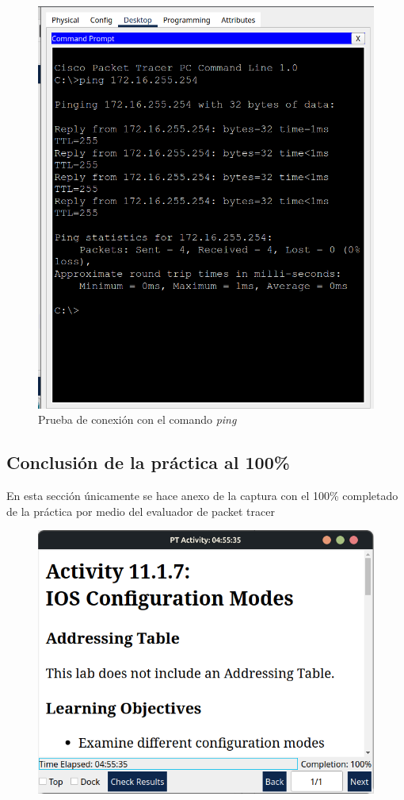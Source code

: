 \documentclass[a4paper,11pt]{article}
\begin{document}
\begin{figure}[H]
    \includegraphics[width=1\textwidth]{images/routers/ping.png}
    \caption{Prueba de conexión con el comando \emph{ping}}
\end{figure}

\subsection{Conclusión de la práctica al 100\%}
En esta sección únicamente se hace anexo de la captura con el 100\% completado
de la práctica por medio del evaluador de packet tracer

\begin{figure}[H]
    \includegraphics[width=1\textwidth]{images/routers/completion.png}
\end{figure}
\end{document}
